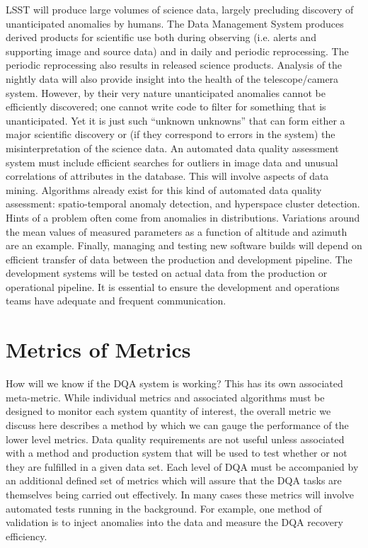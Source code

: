 \documentclass[SE,toc,lsstdraft]{lsstdoc}
\begin{document}
LSST will produce large volumes of science data, largely precluding discovery of unanticipated anomalies by humans.  The Data Management System produces derived products for scientific use both during observing (i.e. alerts and supporting image and source data) and in daily and periodic reprocessing.  The periodic reprocessing also results in released science products. Analysis of the nightly data will also provide insight into the health of the telescope/camera system.  However, by their very nature unanticipated anomalies cannot be efficiently discovered; one cannot write code to filter for something that is unanticipated. Yet it is just such ``unknown unknowns'' that can form either a major scientific discovery or (if they correspond to errors in the system) the misinterpretation of the science data.  An automated data quality assessment system must include efficient searches for outliers in image data and unusual correlations of attributes in the database. This will involve aspects of data mining.  Algorithms already exist for this kind of automated data quality assessment: spatio-temporal anomaly detection, and hyperspace cluster detection.
Hints of a problem often come from anomalies in distributions.  Variations around the mean values of measured parameters as a function of altitude and azimuth are an example.
Finally, managing and testing new software builds will depend on efficient transfer of data between the production and development pipeline. The development systems will be tested on actual data from the production or operational pipeline. It is essential to ensure the development and operations teams have adequate and frequent communication.

\section{Metrics of Metrics}

How will we know if the DQA system is working? This has its own associated meta-metric. While individual metrics and associated algorithms must be designed to monitor each system quantity of interest, the overall metric we discuss here describes a method by which we can gauge the performance of the lower level metrics.
Data quality requirements are not useful unless associated with a
method and production system that will be used to test whether or not they are fulfilled in
a given data set. Each level of DQA must be accompanied by an additional defined set of metrics which will assure that
the DQA tasks are themselves being carried out effectively. In many cases these metrics will involve
automated tests running in the background.
For example, one method of validation is to inject anomalies into the data and measure the DQA recovery efficiency.
\end{document}
